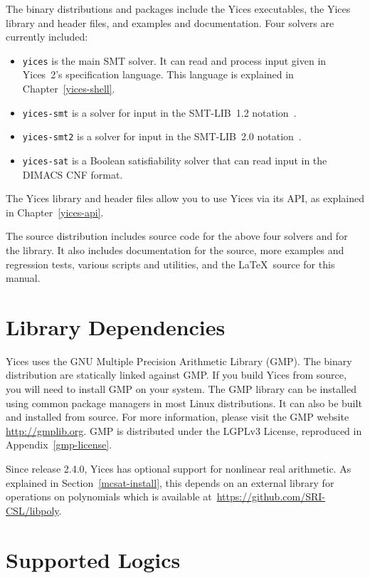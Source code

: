 \documentclass[11pt,twoside,fleqn,openright,titlepage]{cslreport}
\begin{document}
The binary distributions and packages include the Yices executables,
the Yices library and header files, and examples and documentation.
Four solvers are currently included:
\begin{itemize}
\item \texttt{yices} is  the main SMT solver. It  can read and process
  input given  in Yices~2's  specification language. This  language is
  explained in Chapter~\ref{yices-shell}.

\item  \texttt{yices-smt} is  a solver  for input  in  the SMT-LIB~1.2
  notation~\cite{SMTLIB12:2006}.

\item \texttt{yices-smt2} is a solver for input in the SMT-LIB~2.0
  notation~\cite{SMTLIB25:2015}.

\item \texttt{yices-sat}  is a Boolean satisfiability  solver that can
  read input in the DIMACS CNF format.
\end{itemize}
The Yices library and header files allow you to use Yices via its
API, as explained in Chapter~\ref{yices-api}.

The source distribution includes source code for the above four
solvers and for the library. It also includes documentation for the
source, more examples and regression tests, various scripts and
utilities, and the \LaTeX\ source for this manual.


\section{Library Dependencies}

Yices uses the GNU Multiple Precision Arithmetic Library (GMP).  The
binary distribution are statically linked against GMP. If you build
Yices from source, you will need to install GMP on your system.  The
GMP library can be installed using common package managers in most
Linux distributions. It can also be built and installed from
source. For more information, please visit the GMP website
\url{http://gmplib.org}. GMP is distributed under the LGPLv3 License,
reproduced in Appendix~\ref{gmp-license}.

Since release 2.4.0, Yices has optional support for nonlinear real
arithmetic. As explained in Section~\ref{mcsat-install}, this depends
on an external library for operations on polynomials which is
available at~\url{https://github.com/SRI-CSL/libpoly}.


\section{Supported Logics}
\end{document}
